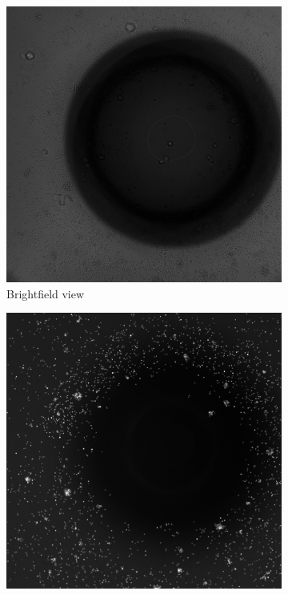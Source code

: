 \begin{figure}[h!]
    \centering
    \begin{subfigure}[h!]{0.3\textwidth}
        \includegraphics[width=\textwidth]{dissertation/figures/faulty_brightfield.jpg}
        \caption{Brightfield view}
    \end{subfigure}
    \begin{subfigure}[h!]{0.3\textwidth}
        \includegraphics[width=\textwidth]{dissertation/figures/faulty_tcell.jpg}

\end{subfigure}
\end{figure}
